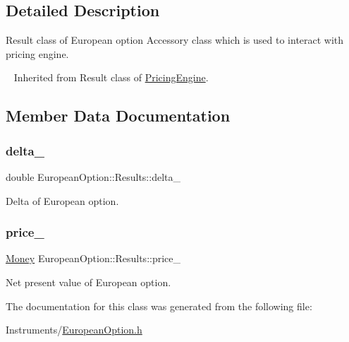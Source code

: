 \subsection{Detailed Description}
Result class of European option Accessory class which is used to interact with pricing engine. 

~\newline
Inherited from Result class of \hyperlink{class_pricing_engine}{Pricing\+Engine}. 

\subsection{Member Data Documentation}
\hypertarget{class_european_option_1_1_results_a3e9ddb58f8e1f69b972bfed5e893414b}{}\label{class_european_option_1_1_results_a3e9ddb58f8e1f69b972bfed5e893414b} 
\subsubsection{\texorpdfstring{delta\+\_\+}{delta\_}}
{\footnotesize\ttfamily double European\+Option\+::\+Results\+::delta\+\_\+}



Delta of European option. 

\hypertarget{class_european_option_1_1_results_a517b87143fda866b135b21051dc4fd6c}{}\label{class_european_option_1_1_results_a517b87143fda866b135b21051dc4fd6c} 
\subsubsection{\texorpdfstring{price\+\_\+}{price\_}}
{\footnotesize\ttfamily \hyperlink{_name_def_8h_a5a9d48c16a694e9a2d9f1eca730dc8c5}{Money} European\+Option\+::\+Results\+::price\+\_\+}



Net present value of European option. 



The documentation for this class was generated from the following file\+:\begin{DoxyCompactItemize}
\item 
Instruments/\hyperlink{_european_option_8h}{European\+Option.\+h}\end{DoxyCompactItemize}

